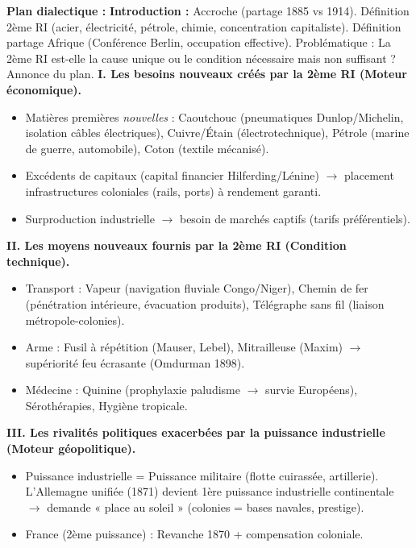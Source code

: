 \documentclass[11pt]{article}
\begin{document}
\begin{exoresolu}
\textbf{Plan dialectique :}
\textbf{Introduction :} Accroche (partage 1885 vs 1914). Définition 2ème RI (acier, électricité, pétrole, chimie, concentration capitaliste). Définition partage Afrique (Conférence Berlin, occupation effective). Problématique : La 2ème RI est-elle la cause unique ou le condition nécessaire mais non suffisant ? Annonce du plan.
\textbf{I. Les besoins nouveaux créés par la 2ème RI (Moteur économique).}
\begin{itemize}
    \item Matières premières \emph{nouvelles} : Caoutchouc (pneumatiques Dunlop/Michelin, isolation câbles électriques), Cuivre/Étain (électrotechnique), Pétrole (marine de guerre, automobile), Coton (textile mécanisé).
    \item Excédents de capitaux (capital financier Hilferding/Lénine) $\rightarrow$ placement infrastructures coloniales (rails, ports) à rendement garanti.
    \item Surproduction industrielle $\rightarrow$ besoin de marchés captifs (tarifs préférentiels).
\end{itemize}
\textbf{II. Les moyens nouveaux fournis par la 2ème RI (Condition technique).}
\begin{itemize}
    \item Transport : Vapeur (navigation fluviale Congo/Niger), Chemin de fer (pénétration intérieure, évacuation produits), Télégraphe sans fil (liaison métropole-colonies).
    \item Arme : Fusil à répétition (Mauser, Lebel), Mitrailleuse (Maxim) $\rightarrow$ supériorité feu écrasante (Omdurman 1898).
    \item Médecine : Quinine (prophylaxie paludisme $\rightarrow$ survie Européens), Sérothérapies, Hygiène tropicale.
\end{itemize}
\textbf{III. Les rivalités politiques exacerbées par la puissance industrielle (Moteur géopolitique).}
\begin{itemize}
    \item Puissance industrielle = Puissance militaire (flotte cuirassée, artillerie). L'Allemagne unifiée (1871) devient 1ère puissance industrielle continentale $\rightarrow$ demande « place au soleil » (colonies = bases navales, prestige).
    \item France (2ème puissance) : Revanche 1870 + compensation coloniale.

\end{itemize}
\end{exoresolu}
\end{document}
